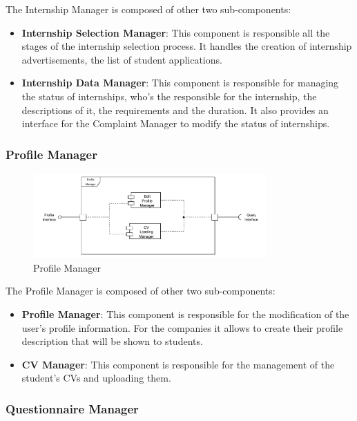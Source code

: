 \par The Internship Manager is composed of other two sub-components:
\begin{itemize}
      \item \textbf{Internship Selection Manager}: This component is responsible all the stages of the internship selection process.
            It handles the creation of internship advertisements, the list of student applications.
      \item \textbf{Internship Data Manager}: This component is responsible for managing the status of internships,
            who's the responsible for the internship, the descriptions of it, the requirements and the duration.
            It also provides an interface for the Complaint Manager to modify the status of internships.
\end{itemize}

\subsubsection{Profile Manager}
\label{subsub:profile-manager}%

\begin{figure}[H]
      \centering
      \includegraphics[width=0.8\textwidth]{Images/Profile_Architecture.pdf}
      \caption{Profile Manager}
      \label{profile-manager-arch}
\end{figure}

\par The Profile Manager is composed of other two sub-components:
\begin{itemize}
      \item \textbf{Profile Manager}: This component is responsible for the modification of the user's profile information.
            For the companies it allows to create their profile description that will be shown to students.
      \item \textbf{CV Manager}: This component is responsible for the management of the student's CVs and uploading them.
\end{itemize}

\subsubsection{Questionnaire Manager}
\label{subsub:questionnaire-manager}%

